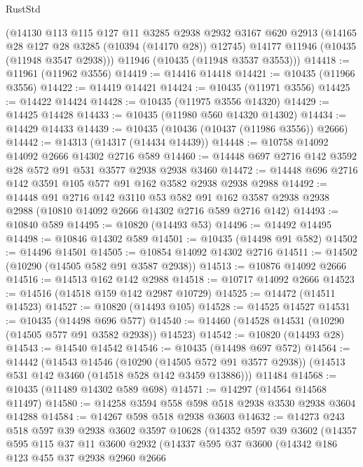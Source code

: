 \begin{lexlean}{RustStd}
\begin{coremodule}
      (@14130
        @113
        @115
        @127
        @11
        @3285
        @2938
        @2932
        @3167
        @620
        @2913
        (@14165 @28 @127 @28 @3285 (@10394 (@14170 @28)) @12745)
        @14177
        @11946
        (@10435 (@11948 @3547 @2938)))
      @11946
      (@10435 (@11948 @3537 @3553)))
@14418 := @11961 (@11962 @3556)
@14419 := @14416 @14418
@14421 := @10435 (@11966 @3556)
@14422 := @14419 @14421
@14424 := @10435 (@11971 @3556)
@14425 := @14422 @14424
@14428 := @10435 (@11975 @3556 @14320)
@14429 := @14425 @14428
@14433 := @10435 (@11980 @560 @14320 @14302)
@14434 := @14429 @14433
@14439 := @10435 (@10436 (@10437 (@11986 @3556)) @2666)
@14442 := @14313 (@14317 (@14434 @14439))
@14448 := @10758 @14092 @14092 @2666 @14302 @2716 @589
@14460 := @14448 @697 @2716 @142 @3592 @28 @572 @91 @531 @3577 @2938 @2938 @3460
@14472 := @14448 @696 @2716 @142 @3591 @105 @577 @91 @162 @3582 @2938 @2938 @2988
@14492 := @14448
    @91
    @2716
    @142
    @3110
    @53
    @582
    @91
    @162
    @3587
    @2938
    @2938
    @2988
    (@10810 @14092 @2666 @14302 @2716 @589 @2716 @142)
@14493 := @10840 @589
@14495 := @10820 (@14493 @53)
@14496 := @14492 @14495
@14498 := @10846 @14302 @589
@14501 := @10435 (@14498 @91 @582)
@14502 := @14496 @14501
@14505 := @10854 @14092 @14302 @2716
@14511 := @14502 (@10290 (@14505 @582 @91 @3587 @2938))
@14513 := @10876 @14092 @2666
@14516 := @14513 @162 @142 @2988
@14518 := @10717 @14092 @2666
@14523 := @14516 (@14518 @159 @142 @2987 @10729)
@14525 := @14472 (@14511 @14523)
@14527 := @10820 (@14493 @105)
@14528 := @14525 @14527
@14531 := @10435 (@14498 @696 @577)
@14540 := @14460 (@14528 @14531 (@10290 (@14505 @577 @91 @3582 @2938)) @14523)
@14542 := @10820 (@14493 @28)
@14543 := @14540 @14542
@14546 := @10435 (@14498 @697 @572)
@14564 := @14442
    (@14543
      @14546
      (@10290 (@14505 @572 @91 @3577 @2938))
      (@14513 @531 @142 @3460 (@14518 @528 @142 @3459 @13886)))
    @11484
@14568 := @10435 (@11489 @14302 @589 @698)
@14571 := @14297 (@14564 @14568 @11497)
@14580 := @14258 @3594 @558 @598 @518 @2938 @3530 @2938 @3604 @14288
@14584 := @14267 @598 @518 @2938 @3603
@14632 := @14273
    @243
    @518
    @597
    @39
    @2938
    @3602
    @3597
    @10628
    (@14352
      @597
      @39
      @3602
      (@14357
        @595
        @115
        @37
        @11
        @3600
        @2932
        (@14337
          @595
          @37
          @3600
          (@14342
            @186
            @123
            @455
            @37
            @2938
            @2960
            @2666

\end{coremodule}
\end{lexlean}
